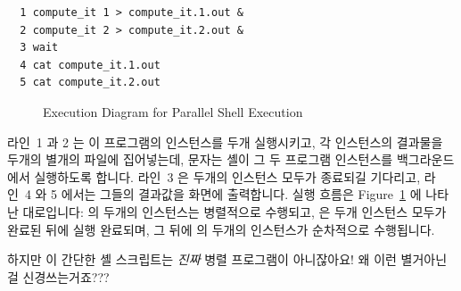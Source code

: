 \vspace{5pt}
\begin{minipage}[t]{\columnwidth}
\scriptsize
\begin{verbatim}
  1 compute_it 1 > compute_it.1.out &
  2 compute_it 2 > compute_it.2.out &
  3 wait
  4 cat compute_it.1.out
  5 cat compute_it.2.out
\end{verbatim}
\end{minipage}
\vspace{5pt}

\begin{figure}[tb]
\centering
{}
\caption{Execution Diagram for Parallel Shell Execution}
\label{fig:toolsoftrade:Execution Diagram for Parallel Shell Execution}
\end{figure}

라인~1 과 2 는 이 프로그램의 인스턴스를 두개 실행시키고, 각 인스턴스의 결과물을 두개의 별개의 파일에 집어넣는데, \co{&} 문자는 셸이 그 두 프로그램 인스턴스를 백그라운드에서 실행하도록 합니다.
라인~3 은 두개의 인스턴스 모두가 종료되길 기다리고, 라인~4 와 5 에서는 그들의 결과값을 화면에 출력합니다.
실행 흐름은 Figure~\ref{fig:toolsoftrade:Execution Diagram for Parallel Shell Execution} 에 나타난 대로입니다:
 의 두개의 인스턴스는 병렬적으로 수행되고,  은 두개 인스턴스 모두가 완료된 뒤에 실행 완료되며, 그 뒤에 의 두개의 인스턴스가 순차적으로 수행됩니다.

\QuickQuiz{}
	하지만 이 간단한 셸 스크립트는 \emph{진짜} 병렬 프로그램이 아니잖아요!
	왜 이런 별거아닌 걸 신경쓰는거죠???

